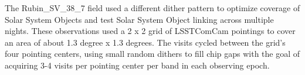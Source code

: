 The Rubin\_SV\_38\_7 field used a different dither pattern to optimize coverage of Solar System Objects and test Solar System \gls{Object} linking across multiple nights.
These observations used a 2 x 2 grid of \gls{LSSTComCam} pointings to cover an area of about 1.3 degree x 1.3 degrees.
The visits cycled between the grid’s four pointing centers, using small random dithers to fill chip gaps with the goal of acquiring 3-4 visits per pointing center per band in each observing \gls{epoch}.



